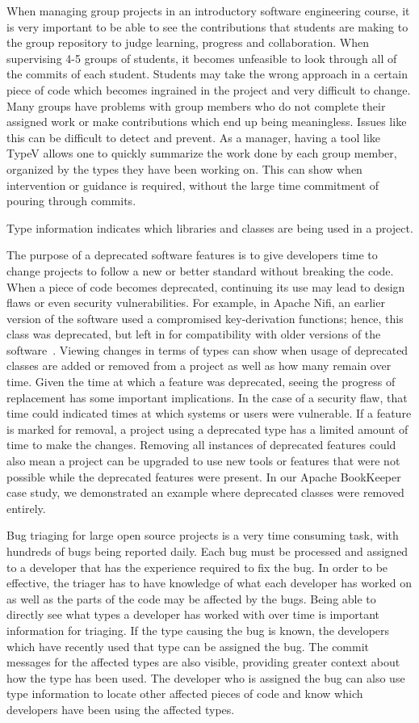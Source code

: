 When managing group projects in an introductory software engineering course, it is very important to be able to see the contributions that students are making to the group repository to judge learning, progress and collaboration. When supervising 4-5 groups of students, it becomes unfeasible to look through all of the commits of each student. Students may take the wrong approach in a certain piece of code which becomes ingrained in the project and very difficult to change. Many groups have problems with group members who do not complete their assigned work or make contributions which end up being meaningless. Issues like this can be difficult to detect and prevent. As a manager, having a tool like TypeV allows one to quickly summarize the work done by each group member, organized by the types they have been working on. This can show when intervention or guidance is required, without the large time commitment of pouring through commits.

Type information indicates which libraries and classes are being used in a project. 

The purpose of a deprecated software features is to give developers time to change projects to follow a new or better standard without breaking the code. When a piece of code becomes deprecated, continuing its use may lead to design flaws or even security vulnerabilities. For example, in Apache Nifi, an earlier version of the software used a compromised key-derivation functions; hence, this class was deprecated, but left in for compatibility with older versions of the software~\cite{nifi}. Viewing changes in terms of types can show when usage of deprecated classes are added or removed from a project as well as how many remain over time. Given the time at which a feature was deprecated, seeing the progress of replacement has some important implications. In the case of a security flaw, that time could indicated times at which systems or users were vulnerable. If a feature is marked for removal, a project using a deprecated type has a limited amount of time to make the changes. Removing all instances of deprecated features could also mean a project can be upgraded to use new tools or features that were not possible while the deprecated features were present. In our Apache BookKeeper case study,  we demonstrated an example where deprecated classes were removed entirely.

Bug triaging for large open source projects is a very time consuming task, with hundreds  of bugs being reported daily. Each bug must be processed and assigned to a developer that has the experience required to fix the bug. In order to be effective, the triager has to have knowledge of what each developer has worked on as well as the parts of the code may be affected by the bugs. Being able to directly see what types a developer has worked with over time is important information for triaging. If the type causing the bug is known, the developers which have recently used that type can be assigned the bug. The commit messages for the affected types are also visible, providing greater context about how the type has been used. The developer who is assigned the bug can also use type information to locate other affected pieces of code and know which developers have been using the affected types.

